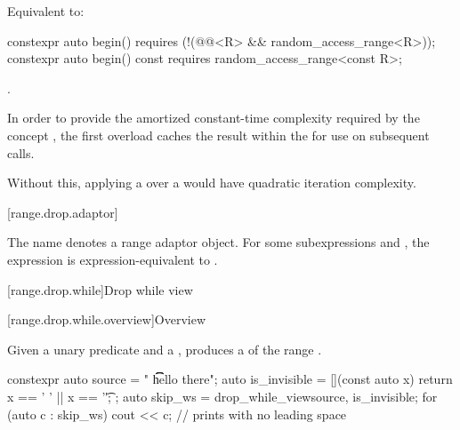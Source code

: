 \documentclass{wg21}
\begin{document}
\begin{itemdescr}
\pnum
\effects
Equivalent to: 
\end{itemdescr}

%
\begin{itemdecl}
constexpr auto begin()
requires (!(@@<R> && random_access_range<R>));
constexpr auto begin() const
requires random_access_range<const R>;
\end{itemdecl}

\begin{itemdescr}
\pnum
\returns
{}.

\pnum
\remarks
In order to provide the amortized constant-time complexity required
by the  concept
,
the first overload caches the result within the 
for use on subsequent calls.
\begin{note}
	Without this,
	applying a  over a 
	would have quadratic iteration complexity.
\end{note}
\end{itemdescr}

[range.drop.adaptor]{}

\pnum
The name  denotes
a range adaptor object.
For some subexpressions  and ,
the expression 
is expression-equivalent to .

[range.drop.while]{Drop while view}

[range.drop.while.overview]{Overview}

\pnum
Given a unary predicate  and a  ,
 produces a 
of the range .

\pnum
\begin{example}
\begin{codeblock}
	constexpr auto source = "  \t   \t   \t   hello there";
	auto is_invisible = [](const auto x) { return x == ' ' || x == '\t'; };
	auto skip_ws = drop_while_view{source, is_invisible};
	for (auto c : skip_ws) {
		cout << c;                                    // prints  with no leading space
	}
\end{codeblock}
\end{example}
\end{document}
